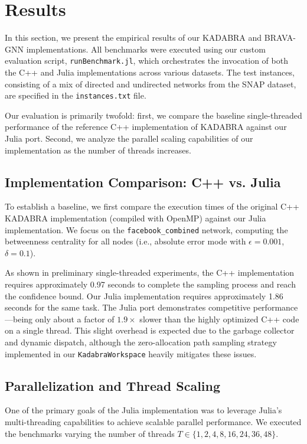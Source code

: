 \section{Results}

In this section, we present the empirical results of our KADABRA and BRAVA-GNN implementations. All benchmarks were executed using our custom evaluation script, \texttt{runBenchmark.jl}, which orchestrates the invocation of both the C++ and Julia implementations across various datasets. The test instances, consisting of a mix of directed and undirected networks from the SNAP dataset, are specified in the \texttt{instances.txt} file.

Our evaluation is primarily twofold: first, we compare the baseline single-threaded performance of the reference C++ implementation of KADABRA against our Julia port. Second, we analyze the parallel scaling capabilities of our implementation as the number of threads increases.

\subsection{Implementation Comparison: C++ vs. Julia}

To establish a baseline, we first compare the execution times of the original C++ KADABRA implementation (compiled with OpenMP) against our Julia implementation. We focus on the \texttt{facebook\_combined} network, computing the betweenness centrality for all nodes (i.e., absolute error mode with $\epsilon=0.001$, $\delta=0.1$).

As shown in preliminary single-threaded experiments, the C++ implementation requires approximately 0.97 seconds to complete the sampling process and reach the confidence bound. Our Julia implementation requires approximately 1.86 seconds for the same task. The Julia port demonstrates competitive performance---being only about a factor of $1.9\times$ slower than the highly optimized C++ code on a single thread. This slight overhead is expected due to the garbage collector and dynamic dispatch, although the zero-allocation path sampling strategy implemented in our \texttt{KadabraWorkspace} heavily mitigates these issues. 

\subsection{Parallelization and Thread Scaling}

One of the primary goals of the Julia implementation was to leverage Julia's multi-threading capabilities to achieve scalable parallel performance. We executed the benchmarks varying the number of threads $T \in \{1, 2, 4, 8, 16, 24, 36, 48\}$.

